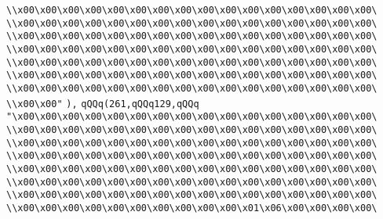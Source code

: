 \verb|\\x00\x00\x00\x00\x00\x00\x00\x00\x00\x00\x00\x00\x00\x00\x00\x00\|\newline
\verb|\\x00\x00\x00\x00\x00\x00\x00\x00\x00\x00\x00\x00\x00\x00\x00\x00\|\newline
\verb|\\x00\x00\x00\x00\x00\x00\x00\x00\x00\x00\x00\x00\x00\x00\x00\x00\|\newline
\verb|\\x00\x00\x00\x00\x00\x00\x00\x00\x00\x00\x00\x00\x00\x00\x00\x00\|\newline
\verb|\\x00\x00\x00\x00\x00\x00\x00\x00\x00\x00\x00\x00\x00\x00\x00\x00\|\newline
\verb|\\x00\x00\x00\x00\x00\x00\x00\x00\x00\x00\x00\x00\x00\x00\x00\x00\|\newline
\verb|\\x00\x00\x00\x00\x00\x00\x00\x00\x00\x00\x00\x00\x00\x00\x00\x00\|\newline
\verb|\\x00\x00"|\newline
\verb|),|\newline
\verb|qQQq(261,qQQq129,qQQq|\newline
\verb|"\x00\x00\x00\x00\x00\x00\x00\x00\x00\x00\x00\x00\x00\x00\x00\x00\|\newline
\verb|\\x00\x00\x00\x00\x00\x00\x00\x00\x00\x00\x00\x00\x00\x00\x00\x00\|\newline
\verb|\\x00\x00\x00\x00\x00\x00\x00\x00\x00\x00\x00\x00\x00\x00\x00\x00\|\newline
\verb|\\x00\x00\x00\x00\x00\x00\x00\x00\x00\x00\x00\x00\x00\x00\x00\x00\|\newline
\verb|\\x00\x00\x00\x00\x00\x00\x00\x00\x00\x00\x00\x00\x00\x00\x00\x00\|\newline
\verb|\\x00\x00\x00\x00\x00\x00\x00\x00\x00\x00\x00\x00\x00\x00\x00\x00\|\newline
\verb|\\x00\x00\x00\x00\x00\x00\x00\x00\x00\x00\x00\x00\x00\x00\x00\x00\|\newline
\verb|\\x00\x00\x00\x00\x00\x00\x00\x00\x00\x00\x01\x06\x00\x00\x00\x00\|\newline
